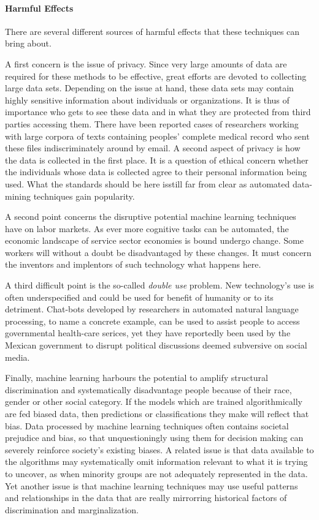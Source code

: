 \documentclass{article}
\begin{document}
\paragraph{Harmful Effects}
There are several different sources of harmful effects that these techniques can bring about.

A first concern is the issue of privacy. Since very large amounts of data are required for these methods to be effective, great efforts are devoted to collecting large data sets. Depending on the issue at hand, these data sets may contain highly sensitive information about individuals or organizations. It is thus of importance who gets to see these data and in what they are protected from third parties accessing them. There have been reported cases of researchers working with large corpora of texts containing peoples' complete medical record who sent these files indiscriminately around by email. A second aspect of privacy is how the data is collected in the first place. It is a question of ethical concern whether the individuals whose data is collected agree to their personal information being used. What the standards should be here isstill  far from clear as automated data-mining techniques gain popularity.

A second point concerns the disruptive potential machine learning techniques have on labor markets. As ever more cognitive tasks can be automated, the economic landscape of service sector economies is bound undergo change. Some workers will without a doubt be disadvantaged by these changes. It must concern the inventors and implentors of such technology what happens here.

A third difficult point is the so-called \emph{double use} problem. New technology's use is often underspecified and could be used for benefit of humanity or to its detriment. Chat-bots developed by researchers in automated natural language processing, to name a concrete example, can be used to assist people to access governmental health-care serices, yet they have reportedly been used by the Mexican government to disrupt political discussions deemed subversive on social media. \cite{leidner2017ethical}

Finally, machine learning harbours the potential to amplify structural discrimination and systematically disadvantage people because of their race, gender or other social category. If the models which are trained algorithmically are fed biased data, then predictions or classifications they make will reflect that bias.
Data processed by machine learning techniques often contains societal prejudice and bias, so that unquestioningly using them for decision making can severely reinforce society's existing biases. A related issue is that data available to the algorithms may systematically omit information relevant to what it is trying to uncover, as when minority groups are not adequately represented in the data. Yet another issue is that machine learning techniques may use useful patterns and relationships in the data that are really mirrorring historical factors of discrimination and marginalization. \cite{barocas2016big}
\end{document}
